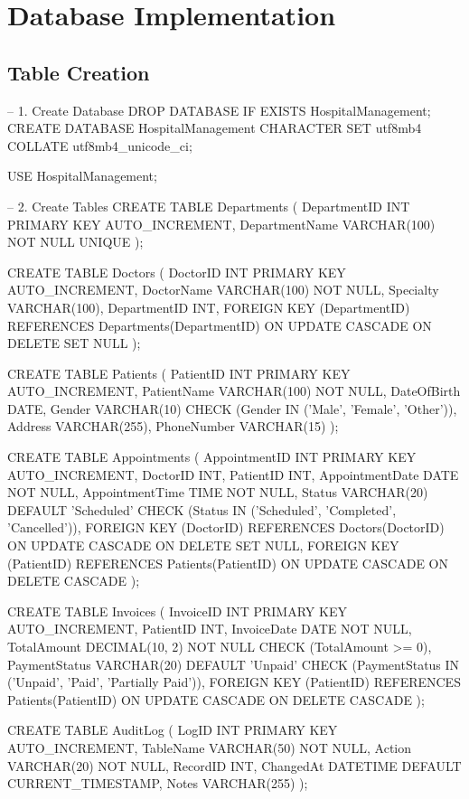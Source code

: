 \section{Database Implementation}
\subsection{Table Creation}
\begin{sqlcode}
-- 1. Create Database
DROP DATABASE IF EXISTS HospitalManagement;
CREATE DATABASE HospitalManagement
    CHARACTER SET utf8mb4
    COLLATE utf8mb4_unicode_ci;

USE HospitalManagement;

-- 2. Create Tables
CREATE TABLE Departments (
    DepartmentID INT PRIMARY KEY AUTO_INCREMENT,
    DepartmentName VARCHAR(100) NOT NULL UNIQUE
);

CREATE TABLE Doctors (
    DoctorID INT PRIMARY KEY AUTO_INCREMENT,
    DoctorName VARCHAR(100) NOT NULL,
    Specialty VARCHAR(100),
    DepartmentID INT,
    FOREIGN KEY (DepartmentID) REFERENCES Departments(DepartmentID)
        ON UPDATE CASCADE
        ON DELETE SET NULL
);

CREATE TABLE Patients (
    PatientID INT PRIMARY KEY AUTO_INCREMENT,
    PatientName VARCHAR(100) NOT NULL,
    DateOfBirth DATE,
    Gender VARCHAR(10) CHECK (Gender IN ('Male', 'Female', 'Other')),
    Address VARCHAR(255),
    PhoneNumber VARCHAR(15)
);

CREATE TABLE Appointments (
    AppointmentID INT PRIMARY KEY AUTO_INCREMENT,
    DoctorID INT,
    PatientID INT,
    AppointmentDate DATE NOT NULL,
    AppointmentTime TIME NOT NULL,
    Status VARCHAR(20) DEFAULT 'Scheduled'
        CHECK (Status IN ('Scheduled', 'Completed', 'Cancelled')),
    FOREIGN KEY (DoctorID) REFERENCES Doctors(DoctorID)
        ON UPDATE CASCADE ON DELETE SET NULL,
    FOREIGN KEY (PatientID) REFERENCES Patients(PatientID)
        ON UPDATE CASCADE ON DELETE CASCADE
);

CREATE TABLE Invoices (
    InvoiceID INT PRIMARY KEY AUTO_INCREMENT,
    PatientID INT,
    InvoiceDate DATE NOT NULL,
    TotalAmount DECIMAL(10, 2) NOT NULL CHECK (TotalAmount >= 0),
    PaymentStatus VARCHAR(20) DEFAULT 'Unpaid'
        CHECK (PaymentStatus IN ('Unpaid', 'Paid', 'Partially Paid')),
    FOREIGN KEY (PatientID) REFERENCES Patients(PatientID)
        ON UPDATE CASCADE ON DELETE CASCADE
);

CREATE TABLE AuditLog (
    LogID INT PRIMARY KEY AUTO_INCREMENT,
    TableName VARCHAR(50) NOT NULL,
    Action VARCHAR(20) NOT NULL,
    RecordID INT,
    ChangedAt DATETIME DEFAULT CURRENT_TIMESTAMP,
    Notes VARCHAR(255)
);
\end{sqlcode}

